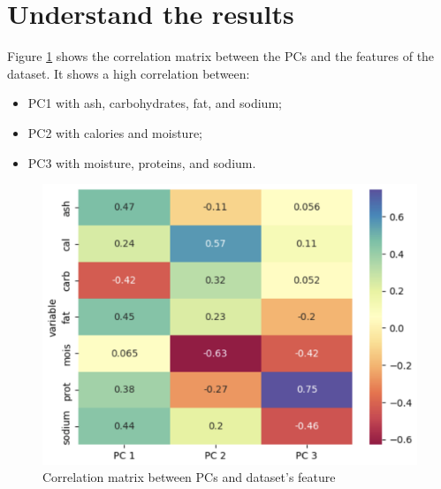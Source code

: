 \documentclass[../main.tex]{subfiles}
\begin{document}
\section{Understand the results}
Figure \ref{fig:correlation_matrix} shows the correlation matrix between the PCs and the features of the dataset. It shows a high correlation between:
\begin{itemize}
    \item PC1 with ash, carbohydrates, fat, and sodium;
    \item PC2 with calories and moisture;
    \item PC3 with moisture, proteins, and sodium.
\end{itemize}
\begin{figure}[H]
    \centering
    \includegraphics[width=\columnwidth]{img/correlationMatrix.png}
    \caption{Correlation matrix between PCs and dataset's feature}
    \label{fig:correlation_matrix}
\end{figure}
\end{document}
